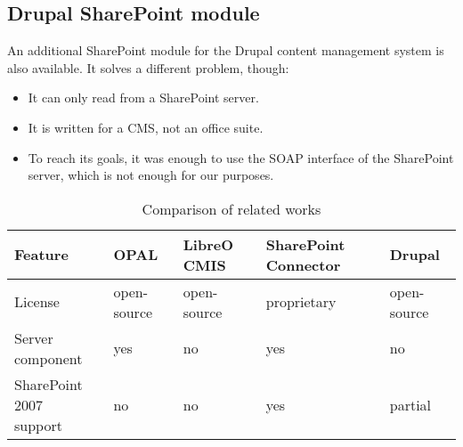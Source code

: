 \subsection*{Drupal SharePoint module}

An additional SharePoint module\cite{drupal-sp} for the Drupal content management system is also available. It solves a different problem, though:

\begin{itemize}
\item It can only read from a SharePoint server.
\item It is written for a CMS, not an office suite.
\item To reach its goals, it was enough to use the SOAP interface of the
SharePoint server, which is not enough for our purposes.
\end{itemize}

\begin{table}[H]
  \begin{center}
    \begin{tabular}{| l | l | l | l | l |}
    \hline
    \textbf{Feature} & \textbf{OPAL} & \textbf{LibreO CMIS} & \textbf{SharePoint Connector} & \textbf{Drupal} \\ \hline
    License & open-source & open-source & proprietary & open-source \\ \hline
    Server component & yes & no & yes & no \\ \hline
    \makecell[l]{SharePoint 2007 \\ support} & no & no & yes & partial \\ \hline
    \end{tabular}
  \end{center}
  \caption{Comparison of related works}
  \label{tab:related-cmp}
\end{table}
